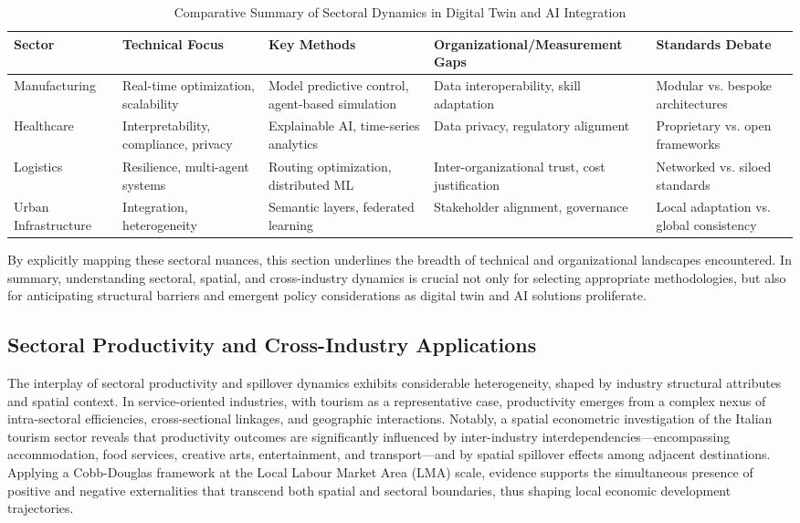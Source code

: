 \documentclass[sigconf]{acmart}
\begin{document}
\begin{table*}[htbp]
\centering
\caption{Comparative Summary of Sectoral Dynamics in Digital Twin and AI Integration}
\label{tab:sector_comparison}
\begin{adjustbox}{max width=\textwidth}
\begin{tabular}{@{}lllll@{}}
\toprule
Sector & Technical Focus & Key Methods & Organizational/Measurement Gaps & Standards Debate \\
\midrule
Manufacturing & Real-time optimization, scalability & Model predictive control, agent-based simulation & Data interoperability, skill adaptation & Modular vs. bespoke architectures \\
Healthcare & Interpretability, compliance, privacy & Explainable AI, time-series analytics & Data privacy, regulatory alignment & Proprietary vs. open frameworks \\
Logistics & Resilience, multi-agent systems & Routing optimization, distributed ML & Inter-organizational trust, cost justification & Networked vs. siloed standards \\
Urban Infrastructure & Integration, heterogeneity & Semantic layers, federated learning & Stakeholder alignment, governance & Local adaptation vs. global consistency \\
\bottomrule
\end{tabular}
\end{adjustbox}
\end{table*}

By explicitly mapping these sectoral nuances, this section underlines the breadth of technical and organizational landscapes encountered. In summary, understanding sectoral, spatial, and cross-industry dynamics is crucial not only for selecting appropriate methodologies, but also for anticipating structural barriers and emergent policy considerations as digital twin and AI solutions proliferate.

\subsection{Sectoral Productivity and Cross-Industry Applications}

The interplay of sectoral productivity and spillover dynamics exhibits considerable heterogeneity, shaped by industry structural attributes and spatial context. In service-oriented industries, with tourism as a representative case, productivity emerges from a complex nexus of intra-sectoral efficiencies, cross-sectional linkages, and geographic interactions. Notably, a spatial econometric investigation of the Italian tourism sector reveals that productivity outcomes are significantly influenced by inter-industry interdependencies—encompassing accommodation, food services, creative arts, entertainment, and transport—and by spatial spillover effects among adjacent destinations. Applying a Cobb-Douglas framework at the Local Labour Market Area (LMA) scale, evidence supports the simultaneous presence of positive and negative externalities that transcend both spatial and sectoral boundaries, thus shaping local economic development trajectories.
\end{document}
